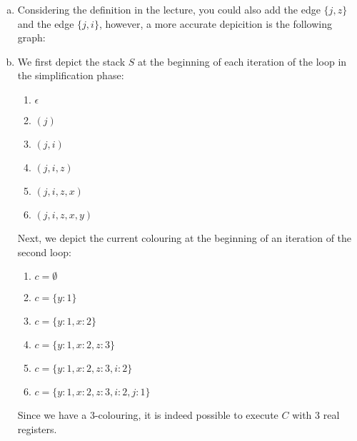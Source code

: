 \begin{solution}
\begin{enumerate}[(a)]
 \item Considering the definition in the lecture, you could also add the edge $\{j,z\}$ and the edge $\{j,i\}$, however, a more accurate depicition is the following graph:
   \begin{center}
 	\end{center}
 	\item We first depict the stack $S$ at the beginning of each iteration of the loop in the simplification phase:
 	\begin{enumerate}
 		\item $\epsilon$
 		\item $(j)$
 		\item $(j,i)$
 		\item $(j,i,z)$
 		\item $(j,i,z,x)$
 		\item $(j,i,z,x,y)$
 	\end{enumerate}
    Next, we depict the current colouring at the beginning of an iteration of the second loop:
    \begin{enumerate}
       \item $ c = \emptyset$
       \item $c= \{y:1\}$
       \item $c= \{y:1, x:2\}$
       \item $c= \{y:1, x:2, z:3\}$
       \item $c= \{y:1, x:2, z:3, i:2\}$
       \item $c= \{y:1, x:2, z:3, i:2, j:1\}$
    \end{enumerate}
    Since we have a $3$-colouring, it is indeed possible to execute $C$ with $3$ real registers.
\end{enumerate}
\end{solution}
